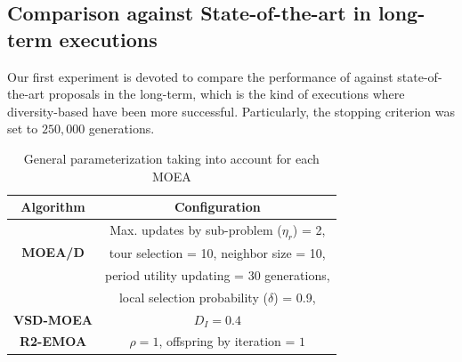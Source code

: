 \subsection{Comparison against State-of-the-art \MOEAS{} in long-term executions}

Our first experiment is devoted to compare the performance of \VSDMOEA{} against state-of-the-art proposals in the long-term, which
is the kind of executions where diversity-based \EAS{} have been more successful.
%
Particularly, the stopping criterion was set to $250,000$ generations.
%

%
\begin{table}[t]
\centering
\caption{ General parameterization taking into account for each MOEA}
\label{tab:Parametrization}
\begin{tabular}{c|c}
\hline
\textbf{Algorithm} & \textbf{Configuration} \\ \hline
\multirow{3}{*}{\textbf{MOEA/D}} &Max. updates by sub-problem ($\eta_r$) = 2, \\
 & tour selection = 10,   neighbor size = 10, \\
 & period utility updating = 30 generations, \\ 
 & local selection probability ($\delta$) = 0.9,\\ \hline
\textbf{VSD-MOEA} & $D_I=0.4$ \\ \hline
\textbf{R2-EMOA} & $\rho=1$, offspring by iteration = $1$ \\ \hline
\end{tabular}
\end{table}







